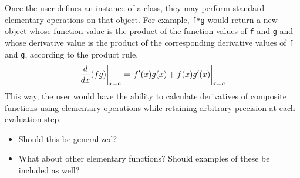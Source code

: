     Once the user defines an instance of a class, they may perform standard 
    elementary operations on that object. For example, \texttt{f*g} would return
    a new object whose function value is the product of the function values of 
    \texttt{f} and \texttt{g} and whose derivative value is the product of the
    corresponding derivative values of \texttt{f} and \texttt{g}, according 
    to the product rule. 
    \begin{equation}
        \left.\frac{d}{dx}(fg)\right|_{x=a} 
        = 
        \left.\vphantom{\frac{d}{dx}}f'(x)g(x) + f(x)g'(x)\right|_{x=a}
    \end{equation}
    This way, the user would have the ability to calculate derivatives of 
    composite functions using elementary operations while retaining arbitrary 
    precision at each evaluation step.
    \begin{itemize}
        \item Should this be generalized?
        \item What about other elementary functions? Should examples of these be
        included as well?
    \end{itemize} 


